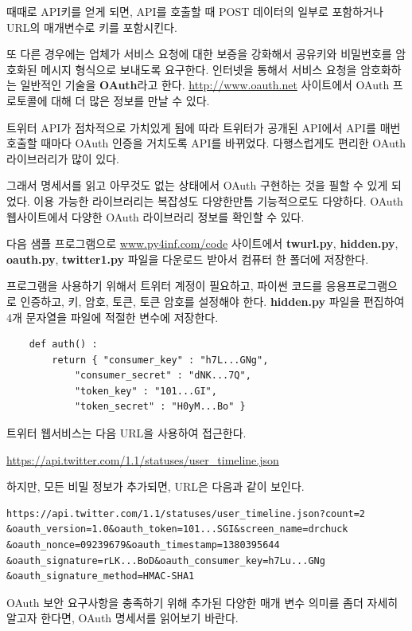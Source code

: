 때때로 API키를 얻게 되면, API를 호출할 때 POST 데이터의 일부로 포함하거나 URL의 매개변수로 키를 포함시킨다.

또 다른 경우에는 업체가 서비스 요청에 대한 보증을 강화해서 공유키와 비밀번호를 암호화된 메시지 형식으로 보내도록 요구한다. 
인터넷을 통해서 서비스 요청을 암호화하는 일반적인 기술을 {\bf OAuth}라고 한다.
\url{http://www.oauth.net} 사이트에서 OAuth 프로토콜에 대해 더 많은 정보를 만날 수 있다. 

트위터 API가 점차적으로 가치있게 됨에 따라 트위터가 공개된 API에서 API를 매번 호출할 때마다 OAuth 인증을 거치도록 API를 바뀌었다. 
다행스럽게도 편리한 OAuth 라이브러리가 많이 있다. 

그래서 명세서를 읽고 아무것도 없는 상태에서 OAuth 구현하는 것을 필할 수 있게 되었다. 
이용 가능한 라이브러리는 복잡성도 다양한만틈 기능적으로도 다양하다. 
 OAuth 웹사이트에서 다양한 OAuth 라이브러리 정보를 확인할 수 있다. 

다음 샘플 프로그램으로 \url{www.py4inf.com/code} 사이트에서 {\bf twurl.py}, {\bf hidden.py}, 
{\bf oauth.py}, {\bf twitter1.py} 파일을 다운로드 받아서 컴퓨터 한 폴더에 저장한다.

프로그램을 사용하기 위해서 트위터 계정이 필요하고, 파이썬 코드를 응용프로그램으로 인증하고,
키, 암호, 토큰, 토큰 암호를 설정해야 한다. 
{\bf hidden.py} 파일을 편집하여 4개 문자열을 파일에 적절한 변수에 저장한다.

\beforeverb
\begin{verbatim}
    def auth() :
        return { "consumer_key" : "h7L...GNg",
            "consumer_secret" : "dNK...7Q",
            "token_key" : "101...GI",
            "token_secret" : "H0yM...Bo" }
\end{verbatim}
\afterverb
%

트위터 웹서비스는 다음 URL을 사용하여 접근한다.

\url{https://api.twitter.com/1.1/statuses/user_timeline.json}

하지만, 모든 비밀 정보가 추가되면, URL은 다음과 같이 보인다.

\beforeverb
\begin{verbatim}
https://api.twitter.com/1.1/statuses/user_timeline.json?count=2
&oauth_version=1.0&oauth_token=101...SGI&screen_name=drchuck
&oauth_nonce=09239679&oauth_timestamp=1380395644
&oauth_signature=rLK...BoD&oauth_consumer_key=h7Lu...GNg
&oauth_signature_method=HMAC-SHA1
\end{verbatim}
\afterverb
%

OAuth 보안 요구사항을 충족하기 위해 추가된 다양한 매개 변수 의미를 좀더 자세히 알고자 한다면,
OAuth 명세서를 읽어보기 바란다.

